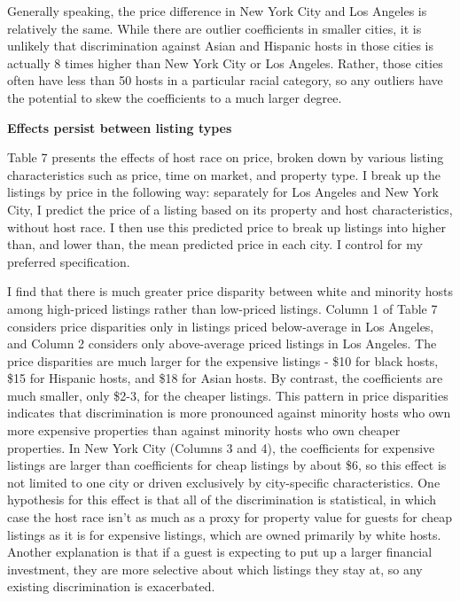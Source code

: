 Generally speaking, the price difference in New York City and Los Angeles is relatively the same. While there are outlier coefficients in smaller cities, it is unlikely that discrimination against Asian and Hispanic hosts in those cities is actually 8 times higher than New York City or Los Angeles. Rather, those cities often have less than 50 hosts in a particular racial category, so any outliers have the potential to skew the coefficients to a much larger degree.  

\textbf{Effects persist between listing types}

Table 7 presents the effects of host race on price, broken down by various listing characteristics such as price, time on market, and property type. I break up the listings by price in the following way: separately for Los Angeles and New York City, I predict the price of a listing based on its property and host characteristics, without host race. I then use this predicted price to break up listings into higher than, and lower than, the mean predicted price in each city. I control for my preferred specification.  

I find that there is much greater price disparity between white and minority hosts among high-priced listings rather than low-priced listings. Column 1 of Table 7 considers price disparities only in listings priced below-average in Los Angeles, and Column 2 considers only above-average priced listings in Los Angeles. The price disparities are much larger for the expensive listings - \$10 for black hosts, \$15 for Hispanic hosts, and \$18 for Asian hosts. By contrast, the coefficients are much smaller, only \$2-3, for the cheaper listings. This pattern in price disparities indicates that discrimination is more pronounced against minority hosts who own more expensive properties than against minority hosts who own cheaper properties. In New York City (Columns 3 and 4), the coefficients for expensive listings are larger than coefficients for cheap listings by about \$6, so this effect is not limited to one city or driven exclusively by city-specific characteristics. One hypothesis for this effect is that all of the discrimination is statistical, in which case the host race isn't as much as a proxy for property value for guests for cheap listings  as it is for expensive listings, which are owned primarily by white hosts. Another explanation is that if a guest is expecting to put up a larger financial investment, they are more selective about which listings they stay at, so any existing discrimination is exacerbated. 

